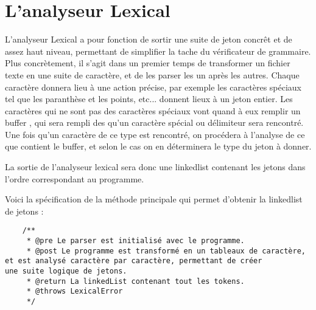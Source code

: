 \section{L'analyseur Lexical}

L'analyseur Lexical a pour fonction de sortir une suite de jeton concrêt et de assez haut niveau, permettant de simplifier la tache du vérificateur de grammaire. Plus concrètement, il s'agit dans un premier temps de transformer un fichier texte en une suite de caractère, et de les parser les un après les autres. Chaque caractère donnera lieu à une action précise, par exemple les caractères spéciaux tel que les paranthèse et les points, etc... donnent lieux à un jeton entier.
Les caractères qui ne sont pas des caractères spéciaux vont quand à eux remplir un buffer , qui sera rempli des qu'un caractère spécial ou délimiteur sera rencontré. Une fois qu'un caractère de ce type est rencontré, on procédera à l'analyse de ce que contient le buffer, et selon le cas on en déterminera le type du jeton à donner.

La sortie de l'analyseur lexical sera donc une linkedlist contenant les jetons dans l'ordre correspondant au programme.

Voici la spécification de la méthode principale qui permet d'obtenir la linkedlist de jetons :
{\tiny
\begin{verbatim}
	/**
	 * @pre Le parser est initialisé avec le programme.
	 * @post Le programme est transformé en un tableaux de caractère, 
et est analysé caractère par caractère, permettant de créer 
une suite logique de jetons.
	 * @return La linkedList contenant tout les tokens.
	 * @throws LexicalError
	 */
\end{verbatim}
}